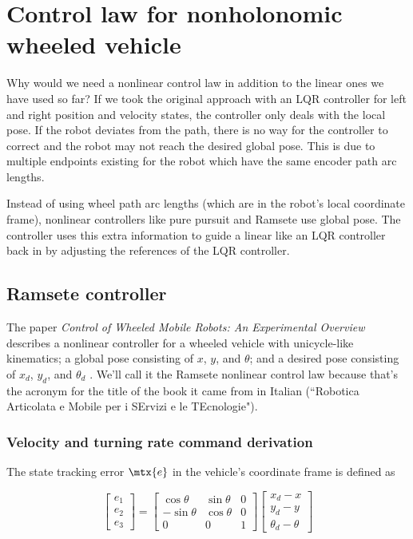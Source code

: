 \section{Control law for nonholonomic wheeled vehicle}

Why would we need a nonlinear control law in addition to the linear ones we have
used so far? If we took the original approach with an LQR \gls{controller} for
left and right position and velocity \glspl{state}, the \gls{controller} only
deals with the local \gls{pose}. If the robot deviates from the path, there is
no way for the \gls{controller} to correct and the robot may not reach the
desired global \gls{pose}. This is due to multiple endpoints existing for the
robot which have the same encoder path arc lengths.

Instead of using wheel path arc lengths (which are in the robot's local
coordinate frame), nonlinear controllers like pure pursuit and Ramsete use
global pose. The \gls{controller} uses this extra information to guide a linear
 like an LQR \gls{controller} back in by
adjusting the \glspl{reference} of the LQR \gls{controller}.

\subsection{Ramsete controller}
\label{subsec:ramsete_controller}

The paper \textit{Control of Wheeled Mobile Robots: An Experimental Overview}
describes a nonlinear controller for a wheeled vehicle with unicycle-like
kinematics; a global \gls{pose} consisting of $x$, $y$, and $\theta$; and a
desired \gls{pose} consisting of $x_d$, $y_d$, and $\theta_d$
\cite{bib:ctrl_wheeled_mobile_robots}. We'll call it the Ramsete nonlinear
control law because that's the acronym for the title of the book it came from in
Italian (``Robotica Articolata e Mobile per i SErvizi e le TEcnologie").

\subsubsection{Velocity and turning rate command derivation}

The \gls{state} tracking \gls{error} $\mtx{e}$ in the vehicle's coordinate frame
is defined as

\begin{equation*}
  \begin{bmatrix}
    e_1 \\
    e_2 \\
    e_3
  \end{bmatrix} =
  \begin{bmatrix}
    \cos\theta & \sin\theta & 0 \\
    -\sin\theta & \cos\theta & 0 \\
    0 & 0 & 1
  \end{bmatrix}
  \begin{bmatrix}
    x_d - x \\
    y_d - y \\
    \theta_d - \theta
  \end{bmatrix}
\end{equation*}

